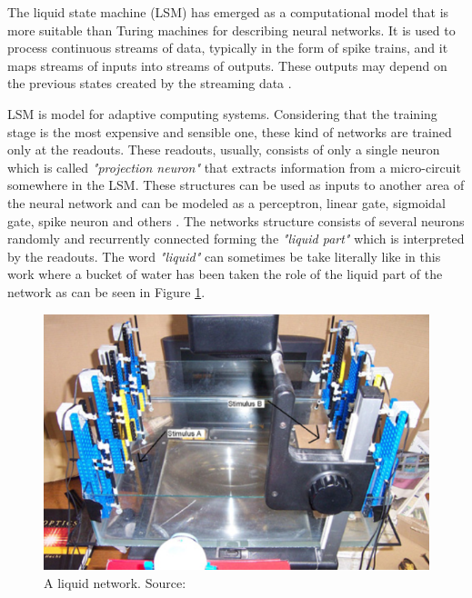 \begin{frame}[allowframebreaks]
	\par The liquid state machine (LSM) has emerged as a computational model that is more suitable than Turing machines for describing neural networks. It is used to process continuous streams of data, typically in the form of spike trains, and it maps streams of inputs into streams of outputs. These outputs may depend on the previous states created by the streaming data \cite{doi:10.1142/9781848162778_0008}.
	
	\par LSM is model for adaptive computing systems. Considering that the training stage is the most expensive and sensible one, these kind of networks are trained only at the readouts. These readouts, usually, consists of only a single neuron which is called \textit{"projection neuron"} that extracts information from a micro-circuit somewhere in the LSM. These structures can be used as inputs to another area of the neural network and can be modeled as a perceptron, linear gate, sigmoidal gate, spike neuron and others \cite{doi:10.1142/9781848162778_0008}. The networks structure consists of several neurons randomly and recurrently connected forming the \textit{"liquid part"} which is interpreted by the readouts. The word \textit{"liquid"} can sometimes be take literally like in this work \cite{10.1007/978-3-540-39432-7_63} where a bucket of water has been taken the role of the liquid part of the network as can be seen in Figure \ref{fig:leterallyaliquidnetwork}.
	
	\begin{figure}
		\centering
		\includegraphics[width=0.7\linewidth]{images/leterallyALiquidNetwork}
		\caption[A liquid network]{A liquid network. Source: \cite{10.1007/978-3-540-39432-7_63}}
		\label{fig:leterallyaliquidnetwork}
	\end{figure}
	
	
	

\end{frame}
